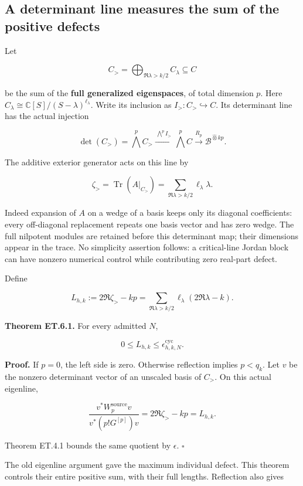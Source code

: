 \subsection{A determinant line measures the sum of the positive
defects}\label{exttrace-a-determinant-line-measures-the-sum-of-the-positive-defects}

Let

\[
C_{>}=\bigoplus_{\Re\lambda>k/2}C_\lambda\subseteq C
\]

be the sum of the \textbf{full generalized eigenspaces}, of total
dimension \(p\). Here
\(C_\lambda\cong\mathbb C[S]/(S-\lambda)^{\ell_\lambda}\). Write its
inclusion as \(I_{>}:C_{>}\hookrightarrow C\). Its determinant line has
the actual injection

\[
\det(C_{>})=\bigwedge^p C_{>}
\xrightarrow{\,\bigwedge^p I_{>}\,}
\bigwedge^p C
\xrightarrow{R_p}
\mathscr B^{\widehat\otimes kp}.
\]

The additive exterior generator acts on this line by

\[
\zeta_{>}=\operatorname{Tr}(A|_{C_{>}})
=\sum_{\Re\lambda>k/2}\ell_\lambda\lambda.
\]

Indeed expansion of \(A\) on a wedge of a basis keeps only its diagonal
coefficients: every off-diagonal replacement repeats one basis vector
and has zero wedge. The full nilpotent modules are retained before this
determinant map; their dimensions appear in the trace. No simplicity
assertion follows: a critical-line Jordan block can have nonzero
numerical control while contributing zero real-part defect.

Define

\[
\boxed{
L_{h,k}:=2\Re\zeta_{>}-kp
=\sum_{\Re\lambda>k/2}\ell_\lambda(2\Re\lambda-k).
}
\]

\textbf{Theorem ET.6.1.} For every admitted \(N\),

\[
\boxed{0\leq L_{h,k}\leq\epsilon_{h,k,N}^{\mathrm{cyc}}.}
\]

\textbf{Proof.} If \(p=0\), the left side is zero. Otherwise reflection
implies \(p<q_k\). Let \(v\) be the nonzero determinant vector of an
unscaled basis of \(C_{>}\). On this actual eigenline,

\[
\frac{v^*W_p^{\mathrm{source}}v}{v^*(p!G^{[p]})v}
=2\Re\zeta_{>}-kp=L_{h,k}.
\]

Theorem ET.4.1 bounds the same quotient by \(\epsilon\). \(\square\)

The old eigenline argument gave the maximum individual defect. This
theorem controls their entire positive sum, with their full lengths.
Reflection also gives

